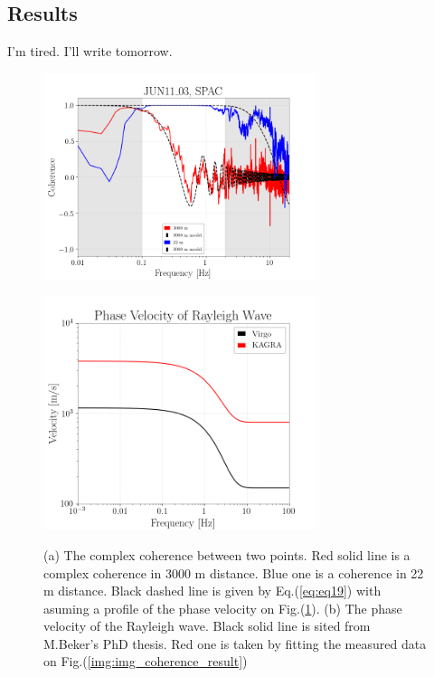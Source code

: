 \subsection{Results}
I'm tired. I'll write tomorrow.
\begin{figure}[H] 
 \begin{minipage}{0.5\hsize}
  \begin{center}
    \includegraphics[width=8.0cm]{../underground_seismic_noise/img_coherence_result.png}    
  \end{center}
  \label{img:img_coherence_result}
 \end{minipage}
 \begin{minipage}{0.5\hsize}
  \begin{center}
    \includegraphics[width=8.0cm]{../underground_seismic_noise/img_RwaveVelocity.png}    
  \end{center}
  \subcaption{}
  \label{img:img_RwaveVelocity}
 \end{minipage}
  \caption{(a) The complex coherence between two points. Red solid line is a complex coherence in 3000 m distance. Blue one is a coherence in 22 m distance. Black dashed line is given by Eq.(\ref{eq:eq19}) with asuming a profile of the phase velocity on Fig.(\ref{img:img_RwaveVelocity}). (b) The phase velocity of the Rayleigh wave. Black solid line is sited from M.Beker's PhD thesis. Red one is taken by fitting the measured data on Fig.(\ref{img:img_coherence_result})} 
\end{figure}

